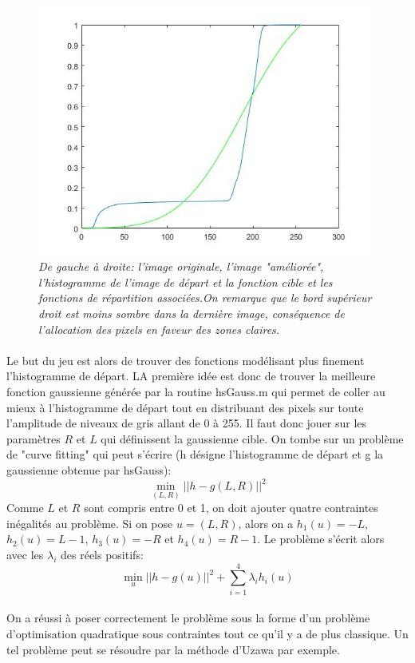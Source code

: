 \documentclass{article}
\begin{document}
\begin{figure}[!hbt]
\begin{minipage}{0.25\textwidth}
\end{minipage}%
\begin{minipage}{0.25\textwidth}
\centering
\includegraphics[width=0.98\textwidth]{images/p3_birds_cumsum.jpg}
\end{minipage}
\caption{\textit{De gauche à droite: l'image originale, l'image "améliorée", l'histogramme de l'image de départ et la fonction cible et les fonctions de répartition associées.On remarque que le bord supérieur droit est moins sombre dans la dernière image, conséquence de l'allocation des pixels en faveur des zones claires.}}
\label{fig:birds}
\end{figure}

\paragraph*{}
Le but du jeu est alors de trouver des fonctions modélisant plus finement l'histogramme de départ. LA première idée est donc de trouver la meilleure fonction gaussienne générée par la routine hsGauss.m qui permet de coller au mieux à l'histogramme de départ tout en distribuant des pixels sur toute l'amplitude de niveaux de gris allant de 0 à 255. Il faut donc jouer sur les paramètres $R$ et $L$ qui définissent la gaussienne cible. On tombe sur un problème de "curve fitting" qui peut s'écrire (h désigne l'histogramme de départ et g la gaussienne obtenue par hsGauss):
\begin{equation}
\min_{(L, R)} ||h - g(L, R)||^2
\end{equation} 
Comme $L$ et $R$ sont compris entre 0 et 1, on doit ajouter quatre contraintes inégalités au problème. Si on pose $u=(L,R)$, alors on a $h_1(u) = -L$, $h_2(u) = L-1$, $h_3(u) = -R$ et $h_4(u) = R-1$. Le problème s'écrit alors avec les $\lambda_i$ des réels positifs:
\begin{equation}
\min_{u} ||h - g(u)||^2 + \sum_{i=1}^4 \lambda_i h_i(u)
\end{equation} 
\paragraph*{}
On a réussi à poser correctement le problème sous la forme d'un problème d'optimisation quadratique sous contraintes tout ce qu'il y a de plus classique. Un tel problème peut se résoudre par la méthode d'Uzawa par exemple.
\end{document}
